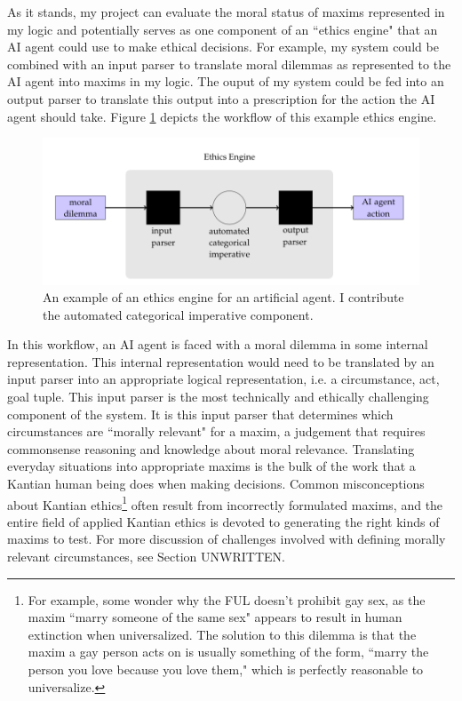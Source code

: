 \begin{isabellebody}
\begin{isamarkuptext}
As it stands, my project can evaluate the moral status of maxims represented in my logic and potentially 
serves as one component of an ``ethics engine" that an AI agent could use to make ethical decisions.
For example, my system could be combined with an input parser to translate moral dilemmas as represented 
to the AI agent into maxims in my logic. The ouput of my system could be fed into an output 
parser to translate this output into a prescription for the action the AI agent should take.
Figure \ref{fig:AIengine} depicts the workflow of this example ethics engine.%
\end{isamarkuptext}\isamarkuptrue%
%
\begin{figure}
\centering
\includegraphics[scale=0.4]{AI_engine.png}
\caption{An example of an ethics engine for an artificial agent. I contribute the automated 
categorical imperative component.} \label{fig:AIengine}
\end{figure}
%
\begin{isamarkuptext}%
In this workflow, an AI agent is faced with a moral dilemma in some internal representation. This 
internal representation would need to be translated by an input parser into an appropriate logical representation, i.e. 
a circumstance, act, goal tuple. This input parser is the most technically and ethically challenging 
component of the system. It is this input parser that determines which circumstances are ``morally relevant"
for a maxim, a judgement that requires commonsense reasoning and knowledge about moral relevance. Translating 
 everyday situations into appropriate maxims is the bulk of the work that a Kantian human being does when making decisions. 
Common misconceptions about Kantian ethics\footnote{For example, some wonder why the FUL doesn't prohibit
gay sex, as the maxim ``marry someone of the same sex" appears to result in human extinction when 
universalized. The solution to this dilemma is that the maxim a gay person acts on is usually something 
of the form, ``marry the person you love because you love them," which is perfectly reasonable to 
universalize.} often result from incorrectly formulated maxims, and the entire field of 
applied Kantian ethics is devoted to generating the right kinds of maxims to test. For more discussion 
of challenges involved with defining morally relevant circumstances, see Section UNWRITTEN.


\end{isamarkuptext}
\end{isabellebody}
